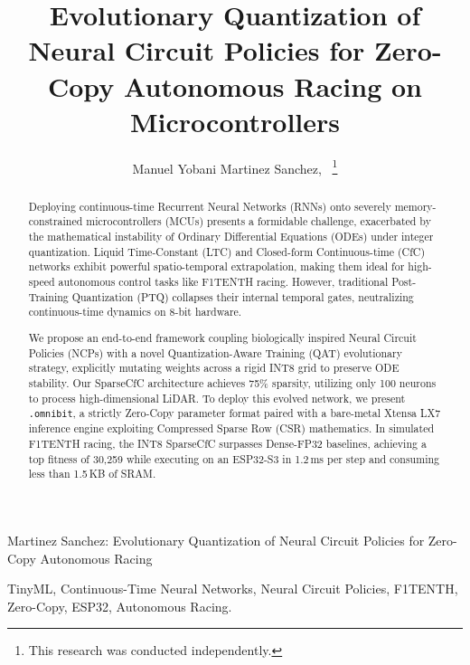 \documentclass[lettersize,journal]{IEEEtran}
\begin{document}
\title{Evolutionary Quantization of Neural Circuit Policies for Zero-Copy Autonomous Racing on Microcontrollers}

\author{Manuel Yobani Martinez Sanchez,~
\thanks{This research was conducted independently.}}

%
{Martinez Sanchez: Evolutionary Quantization of Neural Circuit Policies for Zero-Copy Autonomous Racing}

\maketitle

\begin{abstract}
Deploying continuous-time Recurrent Neural Networks (RNNs) onto severely memory-constrained microcontrollers (MCUs) presents a formidable challenge, exacerbated by the mathematical instability of Ordinary Differential Equations (ODEs) under integer quantization. Liquid Time-Constant (LTC) and Closed-form Continuous-time (CfC) networks exhibit powerful spatio-temporal extrapolation, making them ideal for high-speed autonomous control tasks like F1TENTH racing. However, traditional Post-Training Quantization (PTQ) collapses their internal temporal gates, neutralizing continuous-time dynamics on 8-bit hardware. 

We propose an end-to-end framework coupling biologically inspired Neural Circuit Policies (NCPs) with a novel Quantization-Aware Training (QAT) evolutionary strategy, explicitly mutating weights across a rigid INT8 grid to preserve ODE stability. Our SparseCfC architecture achieves 75\% sparsity, utilizing only 100 neurons to process high-dimensional LiDAR. To deploy this evolved network, we present \texttt{.omnibit}, a strictly Zero-Copy parameter format paired with a bare-metal Xtensa LX7 inference engine exploiting Compressed Sparse Row (CSR) mathematics. In simulated F1TENTH racing, the INT8 SparseCfC surpasses Dense-FP32 baselines, achieving a top fitness of 30,259 while executing on an ESP32-S3 in 1.2\,ms per step and consuming less than 1.5\,KB of SRAM.
\end{abstract}

\begin{IEEEkeywords}
TinyML, Continuous-Time Neural Networks, Neural Circuit Policies, F1TENTH, Zero-Copy, ESP32, Autonomous Racing.
\end{IEEEkeywords}
\end{document}
